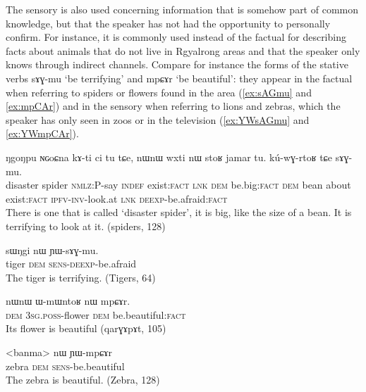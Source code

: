 \documentclass[oldfontcommands,oneside,a4paper,11pt]{article}
\newcommand{\ipa}[1]{{\phon \mbox{#1}}} %
\newcommand{\factual}[1]{\textsc{:fact}}
\begin{document}
The sensory is also used concerning information that is somehow part of common knowledge, but that the speaker has not had the opportunity to personally confirm. For instance, it is commonly used instead of the factual for describing facts about animals that do not live in Rgyalrong areas and that the speaker only knows through indirect channels. Compare for instance the forms of the stative verbs \ipa{sɤɣ-mu} `be terrifying' and \ipa{mpɕɤr} `be beautiful': they appear in the factual when referring to  spiders or flowers found in the area (\ref{ex:sAGmu} and \ref{ex:mpCAr}) and in the sensory when referring to lions and zebras, which the speaker has only seen in zoos or in the television  (\ref{ex:YWsAGmu} and \ref{ex:YWmpCAr}).

 
 
 \begin{exe}
\ex \label{ex:sAGmu}
\gll 
\ipa{ŋgoŋpu}  	\ipa{ɴɢoɕna}  	\ipa{kɤ-ti}  	\ipa{ci}  	\ipa{tu}  	\ipa{tɕe,}  	\ipa{nɯnɯ}  	\ipa{wxti}  	\ipa{nɯ}  	\ipa{stoʁ}  	\ipa{jamar}  	\ipa{tu.}  	\ipa{kú-wɣ-rtoʁ}  	\ipa{tɕe}  	\ipa{sɤɣ-mu.}  \\
disaster spider \textsc{nmlz}:P-say \textsc{indef} exist\factual{} \textsc{lnk} \textsc{dem} be.big\factual{} \textsc{dem} bean about exist\factual{} \textsc{ipfv-inv}-look.at \textsc{lnk} \textsc{deexp}-be.afraid\factual{}  \\
\glt There is one that is  called `disaster spider', it is big, like the size of a bean. It is terrifying to look at it. (spiders, 128)
\end{exe}

\begin{exe}
\ex \label{ex:YWsAGmu}
\gll 
\ipa{sɯŋgi}  	\ipa{nɯ}  	\ipa{ɲɯ-sɤɣ-mu.}  \\
tiger \textsc{dem} \textsc{sens-deexp}-be.afraid \\
\glt The tiger  is terrifying. (Tigers, 64)
\end{exe}


\begin{exe}
\ex \label{ex:mpCAr}
\gll
\ipa{nɯnɯ}  	\ipa{ɯ-mɯntoʁ}  	\ipa{nɯ}  	\ipa{mpɕɤr.}  \\
\textsc{dem} \textsc{3sg.poss}-flower \textsc{dem} be.beautiful\factual{} \\
\glt Its flower is beautiful (\ipa{qarɣɤpɤt}, 105)
\end{exe}


\begin{exe}
\ex \label{ex:YWmpCAr}
\gll 
<banma> 	\ipa{nɯ}  	\ipa{ɲɯ-mpɕɤr}  \\
zebra \textsc{dem} \textsc{sens}-be.beautiful \\
\glt The zebra is beautiful. (Zebra, 128)
\end{exe}
\end{document}
